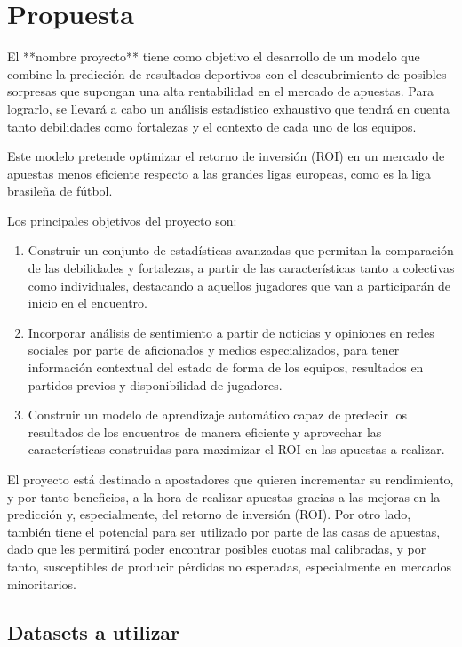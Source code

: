 \section{Propuesta}

El **nombre proyecto** tiene como objetivo el desarrollo de un modelo que combine la predicción de resultados deportivos con el descubrimiento de posibles sorpresas que supongan una alta rentabilidad en el mercado de apuestas. Para lograrlo, se llevará a cabo un análisis estadístico exhaustivo que tendrá en cuenta tanto debilidades como fortalezas y el contexto de cada uno de los equipos.

Este modelo pretende optimizar el retorno de inversión (ROI) en un mercado de apuestas menos eficiente respecto a las grandes ligas europeas, como es la liga brasileña de fútbol.

Los principales objetivos del proyecto son:

\begin{enumerate}
    \item Construir un conjunto de estadísticas avanzadas que permitan la comparación de las debilidades y fortalezas, a partir de las características tanto a colectivas como individuales, destacando a aquellos jugadores que van a participarán de inicio en el encuentro.
    \item Incorporar análisis de sentimiento a partir de noticias y opiniones en redes sociales por parte de aficionados y medios especializados, para tener información contextual del estado de forma de los equipos, resultados en partidos previos y disponibilidad de jugadores.
    \item Construir un modelo de aprendizaje automático capaz de predecir los resultados de los encuentros de manera eficiente y aprovechar las características construidas para maximizar el ROI en las apuestas a realizar.
\end{enumerate}

El proyecto está destinado a apostadores que quieren incrementar su rendimiento, y por tanto beneficios, a la hora de realizar apuestas gracias a las mejoras en la predicción y, especialmente, del retorno de inversión (ROI). Por otro lado, también tiene el potencial para ser utilizado por parte de las casas de apuestas, dado que les permitirá poder encontrar posibles cuotas mal calibradas, y por tanto, susceptibles de producir pérdidas no esperadas, especialmente en mercados minoritarios.

\subsection{Datasets a utilizar}

